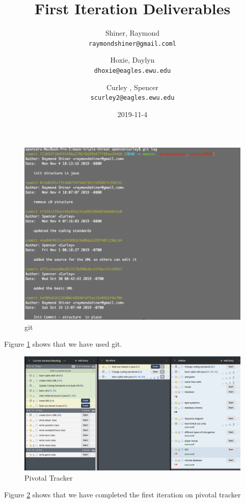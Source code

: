 \documentclass{article}
\title{\huge First Iteration Deliverables }
\date{2019-11-4}
\author{
  Shiner, Raymond\\
  \texttt{raymondshiner@gmail.coml}
  \and
  Hoxie, Daylyn\\
  \texttt{dhoxie@eagles.ewu.edu}
  \and 
  Curley , Spencer\\
   \texttt{scurley2@eagles.ewu.edu}
}
\begin{document}
\maketitle

\newpage
\begin{figure}
  \includegraphics[width=\linewidth]{git.png}
  \caption{git}
  \label{fig:git}
\end{figure}

\noindent Figure \ref{fig:git} shows that we have used git. \newline 


\begin{figure}
  \includegraphics[width=\linewidth]{img.png}
  \caption{Pivotal Tracker}
  \label{fig:pivotalTracker}
\end{figure}
\newpage

\noindent Figure \ref{fig:pivotalTracker} shows that we have completed the first iteration on pivotal tracker  
\end{document}
